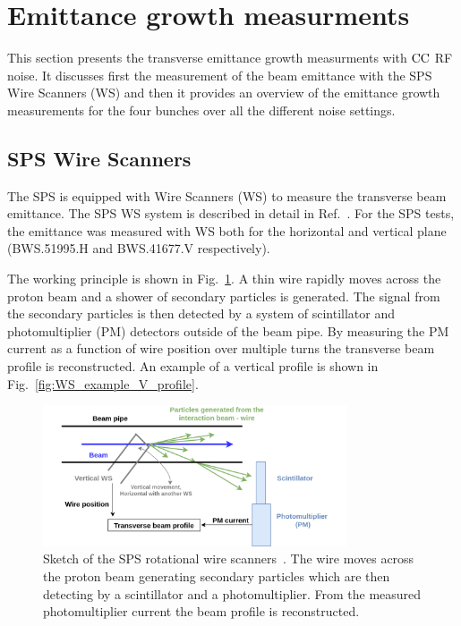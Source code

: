 \section{Emittance growth measurments}\label{sec:emit_growth_meas_2018}
This section presents the transverse emittance growth measurments with ${\mathrm{CC}}$ RF noise. It discusses first the measurement of the beam emittance with the SPS Wire Scanners (WS) and then it provides an overview of the emittance growth measurements for the four bunches over all the different noise settings.

\subsection{SPS Wire Scanners}\label{subsec:sps_ws}
The SPS is equipped with Wire Scanners (WS) to measure the transverse beam emittance. The SPS WS system is described in detail in Ref.~\cite{BOSSER1985475, Berrig:1972478}. For the SPS tests, the emittance was measured with WS both for the horizontal and vertical plane (BWS.51995.H and BWS.41677.V respectively).

The working principle is shown in Fig.~\ref{fig:SPS_WS_ROT}. A thin wire rapidly moves across the proton beam and a shower of secondary particles is generated. The signal from the secondary particles is then detected by a system of scintillator and photomultiplier (PM) detectors outside of the beam pipe. By measuring the PM current as a function of wire position over multiple turns the transverse beam profile is reconstructed. An example of a vertical profile is shown in Fig.~\ref{fig:WS_example_V_profile}.

\begin{figure}[!h]
   \centering         
   \includegraphics[width=0.8\textwidth]{images/Ch5/Wire_scanner.png}
       \caption{Sketch of the SPS rotational wire scanners~\cite{Berrig:1972478}. The wire moves across the proton beam generating secondary particles which are then detecting by a scintillator and a photomultiplier. From the measured photomultiplier current the beam profile is reconstructed.}
       \label{fig:SPS_WS_ROT}
\end{figure}
